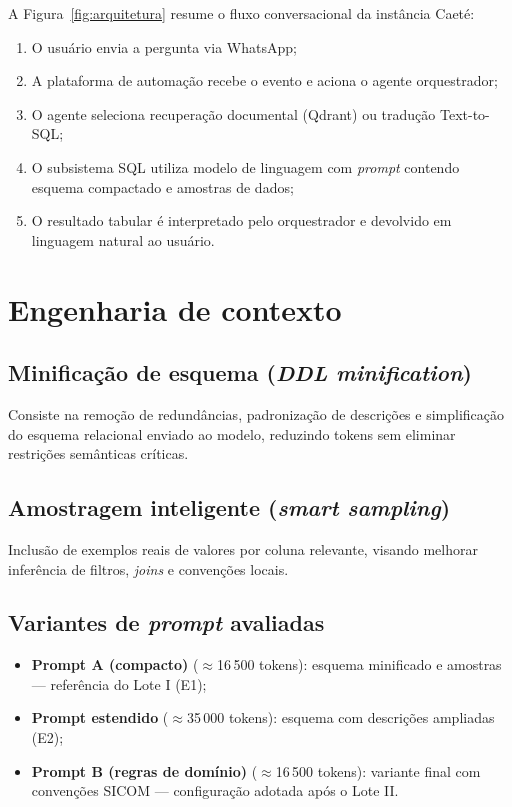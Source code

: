 A Figura~\ref{fig:arquitetura} resume o fluxo conversacional da instância Caeté:



\begin{enumerate}
    \item O usuário envia a pergunta via WhatsApp;
    \item A plataforma de automação recebe o evento e aciona o agente orquestrador;
    \item O agente seleciona recuperação documental (Qdrant) ou tradução Text-to-SQL;
    \item O subsistema SQL utiliza modelo de linguagem com \textit{prompt} contendo esquema compactado e amostras de dados;
    \item O resultado tabular é interpretado pelo orquestrador e devolvido em linguagem natural ao usuário.
\end{enumerate}

\section{Engenharia de contexto}

\subsection{Minificação de esquema (\textit{DDL minification})}

Consiste na remoção de redundâncias, padronização de descrições e simplificação do esquema relacional enviado ao modelo, reduzindo tokens sem eliminar restrições semânticas críticas.

\subsection{Amostragem inteligente (\textit{smart sampling})}

Inclusão de exemplos reais de valores por coluna relevante, visando melhorar inferência de filtros, \textit{joins} e convenções locais.

\subsection{Variantes de \textit{prompt} avaliadas}

\begin{itemize}
    \item \textbf{Prompt A (compacto)} ($\approx$16\,500 tokens): esquema minificado e amostras --- referência do Lote I (E1);
    \item \textbf{Prompt estendido} ($\approx$35\,000 tokens): esquema com descrições ampliadas (E2);
    \item \textbf{Prompt B (regras de domínio)} ($\approx$16\,500 tokens): variante final com convenções SICOM --- configuração adotada após o Lote II.
\end{itemize}

